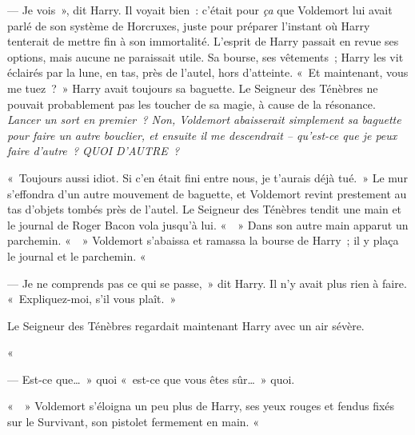 --- Je vois~», dit Harry.
Il voyait bien~: c'était pour \emph{ça} que Voldemort lui avait parlé de son système de Horcruxes, juste pour préparer l'instant où Harry tenterait de mettre fin à son immortalité.
L'esprit de Harry passait en revue ses options, mais aucune ne paraissait utile.
Sa bourse, ses vêtements~; Harry les vit éclairés par la lune, en tas, près de l'autel, hors d'atteinte.
«~Et maintenant, vous me tuez~?~»
Harry avait toujours sa baguette.
Le Seigneur des Ténèbres ne pouvait probablement pas les toucher de sa magie, à cause de la résonance.
\emph{Lancer un sort en premier~?
Non, Voldemort abaisserait simplement sa baguette pour faire un autre bouclier, et ensuite il me descendrait -- qu'est-ce que je peux faire d'autre~?
QUOI D'AUTRE~?}

«~Toujours aussi idiot.
Si c'en était fini entre nous, je t'aurais déjà tué.~»
Le mur s'effondra d'un autre mouvement de baguette, et Voldemort revint prestement au tas d'objets tombés près de l'autel.
Le Seigneur des Ténèbres tendit une main et le journal de Roger Bacon vola jusqu'à lui.
«~~» Dans son autre main apparut un parchemin.
«~~» Voldemort s'abaissa et ramassa la bourse de Harry~; il y plaça le journal et le parchemin.
«~

--- Je ne comprends pas ce qui se passe,~» dit Harry.
Il n'y avait plus rien à faire.
«~Expliquez-moi, s'il vous plaît.~»

Le Seigneur des Ténèbres regardait maintenant Harry avec un air sévère.

«~

--- Est-ce que…~»
quoi «~est-ce que vous êtes sûr…~»
quoi.

«~~» Voldemort s'éloigna un peu plus de Harry, ses yeux rouges et fendus fixés sur le Survivant, son pistolet fermement en main.
«~

